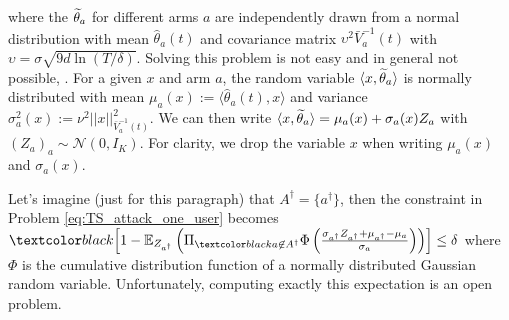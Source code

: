 where the $\widetilde{\theta}_{a}$ for different arms $a$ are independently drawn from a normal distribution with mean $\hat{\theta}_{a}(t)$ and covariance matrix $\upsilon^{2}\bar{V}_{a}^{-1}(t)$ with $\upsilon = \sigma\sqrt{9d\ln(T/\delta)}$. Solving this problem is not easy and in general not possible, . For a given $x$ and arm $a$, the random variable $\langle x, \widetilde{\theta}_{a}\rangle$ is normally distributed with mean $\mu_{a}(x) := \langle \hat{\theta}_{a}(t), x\rangle$ and variance $\sigma_{a}^{2}(x) := \nu^{2}||x||_{\bar{V}_{a}^{-1}(t)}^{2}$. We can then write $\langle x,\widetilde{\theta}_{a}\rangle = \mu_{a}(x) + \sigma_{a}(x)Z_{a}$ with $(Z_{a})_{a}\sim\mathcal{N}(0, I_{K})$. For  clarity, we drop the variable $x$ when writing $\mu_{a}(x)$ and $\sigma_{a}(x)$. 


Let's imagine (just for this paragraph) that $A^{\dagger} = \{ a^{\dagger}\}$, then the constraint in Problem \eqref{eq:TS_attack_one_user} becomes $\changebrtwo{\left[1-\mathbb{E}_{Z_{a^{\dagger}}}\left( \Pi_{\changebrtwo{a\not\in A^{\dagger}}} \Phi\left( \frac{\sigma_{a^\dagger}Z_{a^{\dagger}}+\mu_{a^\dagger} - \mu_{a}}{\sigma_{a}}\right)\right)\right]\leq\delta}$ 
 where $\Phi$ is the cumulative distribution function of a normally distributed Gaussian random variable. Unfortunately, computing exactly this expectation is an open problem.%
 
